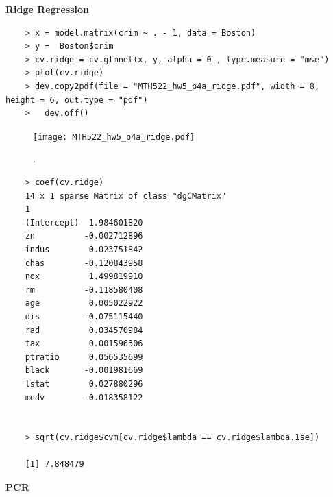 \documentclass{article}
\begin{document}
\newpage
{\bf Ridge Regression}

\begin{program}
	\begin{verbatim}
	> x = model.matrix(crim ~ . - 1, data = Boston)
	> y =  Boston$crim
	> cv.ridge = cv.glmnet(x, y, alpha = 0 , type.measure = "mse")
	> plot(cv.ridge)
	> dev.copy2pdf(file = "MTH522_hw5_p4a_ridge.pdf", width = 8, height = 6, out.type = "pdf")  
	>   dev.off()
	\end{verbatim}
\end{program}

\begin{figure}[htb]
	\begin{center}
		\texttt{[image: MTH522\_hw5\_p4a\_ridge.pdf]}
	\end{center}
	\caption{.}
	\label{fig:MTH522_hw5_p4a_ridge}
\end{figure}

\newpage

\begin{program}
	\begin{verbatim}
	> coef(cv.ridge)
	14 x 1 sparse Matrix of class "dgCMatrix"
	1
	(Intercept)  1.984601820
	zn          -0.002712896
	indus        0.023751842
	chas        -0.120843958
	nox          1.499819910
	rm          -0.118580408
	age          0.005022922
	dis         -0.075115440
	rad          0.034570984
	tax          0.001596306
	ptratio      0.056535699
	black       -0.001981669
	lstat        0.027880296
	medv        -0.018358122
	
	
	> sqrt(cv.ridge$cvm[cv.ridge$lambda == cv.ridge$lambda.1se])
	
	[1] 7.848479
	\end{verbatim}
\end{program}




\newpage

{\bf PCR}
\end{document}
